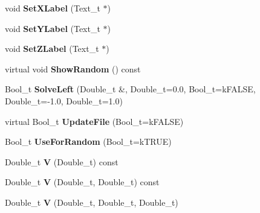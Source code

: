 \begin{DoxyCompactItemize}
\item 
\hypertarget{classTSplineFit_af899b25d4471ad44dd5b69bf1705ab99}{
void {\bfseries SetXLabel} (Text\_\-t $\ast$)}
\label{classTSplineFit_af899b25d4471ad44dd5b69bf1705ab99}

\item 
\hypertarget{classTSplineFit_a28a02bc20b7e0346e5c65d19a208a30d}{
void {\bfseries SetYLabel} (Text\_\-t $\ast$)}
\label{classTSplineFit_a28a02bc20b7e0346e5c65d19a208a30d}

\item 
\hypertarget{classTSplineFit_a624b84677474df077d7fb1d6e46c0444}{
void {\bfseries SetZLabel} (Text\_\-t $\ast$)}
\label{classTSplineFit_a624b84677474df077d7fb1d6e46c0444}

\item 
\hypertarget{classTSplineFit_acd08647d3a4dd26e084a3b9cce9ee3a2}{
virtual void {\bfseries ShowRandom} () const }
\label{classTSplineFit_acd08647d3a4dd26e084a3b9cce9ee3a2}

\item 
\hypertarget{classTSplineFit_a29752fab78d66c7e24dba5e264088209}{
Bool\_\-t {\bfseries SolveLeft} (Double\_\-t \&, Double\_\-t=0.0, Bool\_\-t=kFALSE, Double\_\-t=-\/1.0, Double\_\-t=1.0)}
\label{classTSplineFit_a29752fab78d66c7e24dba5e264088209}

\item 
\hypertarget{classTSplineFit_aae998f6b3a09fc64035a7317664d148e}{
virtual Bool\_\-t {\bfseries UpdateFile} (Bool\_\-t=kFALSE)}
\label{classTSplineFit_aae998f6b3a09fc64035a7317664d148e}

\item 
\hypertarget{classTSplineFit_a6e198070afef0cfb8e9275cafca3a4b5}{
Bool\_\-t {\bfseries UseForRandom} (Bool\_\-t=kTRUE)}
\label{classTSplineFit_a6e198070afef0cfb8e9275cafca3a4b5}

\item 
\hypertarget{classTSplineFit_aeae9e7a0544dc3af229ec3d85ae6ea06}{
Double\_\-t {\bfseries V} (Double\_\-t) const }
\label{classTSplineFit_aeae9e7a0544dc3af229ec3d85ae6ea06}

\item 
\hypertarget{classTSplineFit_a5bfaf83c15e5662ab2667b3f54d8cd52}{
Double\_\-t {\bfseries V} (Double\_\-t, Double\_\-t) const }
\label{classTSplineFit_a5bfaf83c15e5662ab2667b3f54d8cd52}

\item 
\hypertarget{classTSplineFit_af6319691cca0b7b3737aef24c92efe4c}{
Double\_\-t {\bfseries V} (Double\_\-t, Double\_\-t, Double\_\-t)}
\label{classTSplineFit_af6319691cca0b7b3737aef24c92efe4c}


\end{DoxyCompactItemize}
